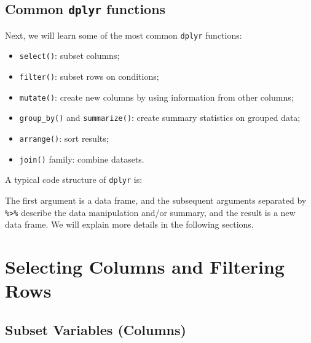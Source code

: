 \documentclass[]{book}
\newenvironment{Shaded}{\begin{snugshade}}{\end{snugshade}}
\newcommand{\StringTok}[1]{\textcolor[rgb]{0.31,0.60,0.02}{#1}}
\newcommand{\OperatorTok}[1]{\textcolor[rgb]{0.81,0.36,0.00}{\textbf{#1}}}
\newcommand{\NormalTok}[1]{#1}
\providecommand{\tightlist}{%
  \setlength{\itemsep}{0pt}\setlength{\parskip}{0pt}}
\begin{document}
\subsection{\texorpdfstring{Common \texttt{dplyr}
functions}{Common dplyr functions}}\label{common-dplyr-functions}

Next, we will learn some of the most common \texttt{dplyr} functions:

\begin{itemize}
\tightlist
\item
  \texttt{select()}: subset columns;
\item
  \texttt{filter()}: subset rows on conditions;
\item
  \texttt{mutate()}: create new columns by using information from other
  columns;
\item
  \texttt{group\_by()} and \texttt{summarize()}: create summary
  statistics on grouped data;
\item
  \texttt{arrange()}: sort results;
\item
  \texttt{join()} family: combine datasets.
\end{itemize}

A typical code structure of \texttt{dplyr} is:

\begin{Shaded}
\end{Shaded}

The first argument is a data frame, and the subsequent arguments
separated by \texttt{\%\textgreater{}\%} describe the data manipulation
and/or summary, and the result is a new data frame. We will explain more
details in the following sections.

\section{Selecting Columns and Filtering
Rows}\label{selecting-columns-and-filtering-rows}

\subsection{Subset Variables (Columns)}\label{subset-variables-columns}
\end{document}
